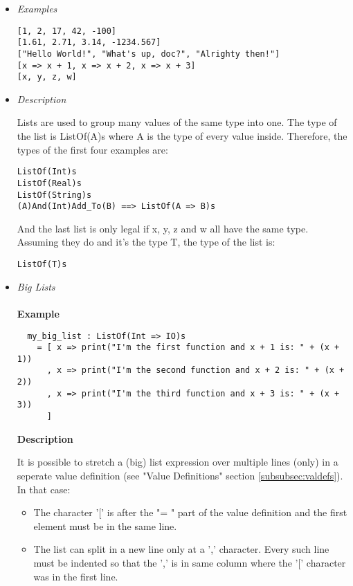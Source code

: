 \documentclass{article}
\begin{document}
\begin{itemize}

\item \textit{Examples}
\begin{verbatim}
[1, 2, 17, 42, -100]
[1.61, 2.71, 3.14, -1234.567]
["Hello World!", "What's up, doc?", "Alrighty then!"]
[x => x + 1, x => x + 2, x => x + 3]
[x, y, z, w]
\end{verbatim}

\item \textit{Description}

Lists are used to group many values of the same type into one. 
The type of the list is ListOf(A)s where A is the type of every value inside.
Therefore, the types of the first four examples are:
\begin{verbatim}
ListOf(Int)s
ListOf(Real)s
ListOf(String)s
(A)And(Int)Add_To(B) ==> ListOf(A => B)s
\end{verbatim}
And the last list is only legal if x, y, z and w all have the same type. Assuming 
they do and it's the type T, the type of the list is: 
\begin{verbatim}
ListOf(T)s
\end{verbatim}

\item \textit{Big Lists}
  \\\\
  \textbf{Example}

  \begin{verbatim}
  my_big_list : ListOf(Int => IO)s
    = [ x => print("I'm the first function and x + 1 is: " + (x + 1))
      , x => print("I'm the second function and x + 2 is: " + (x + 2))
      , x => print("I'm the third function and x + 3 is: " + (x + 3))
      ]
  \end{verbatim}

  \textbf{Description} 

  It is possible to stretch a (big) list expression over multiple lines (only) in
  a seperate value definition (see "Value Definitions" section
  \ref{subsubsec:valdefs}).  In that case:
  \begin{itemize}
  \item
  The character '[' is after the "= " part of the value definition
  and the first element must be in the same line.

  \item
  The list can split in a new line only at a ',' character. Every such line must
  be indented so that the ',' is in same column where the '[' character was in
  the first line.


\end{itemize}
\end{itemize}
\end{document}
